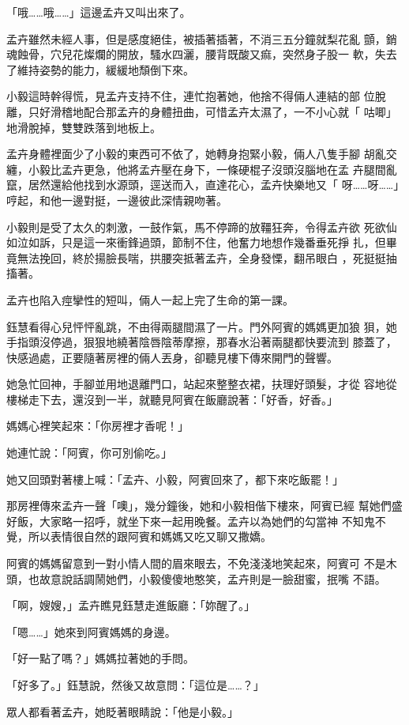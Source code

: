「哦……哦……」這邊孟卉又叫出來了。

孟卉雖然未經人事，但是感度絕佳，被插著插著，不消三五分鐘就梨花亂
顫，銷魂蝕骨，穴兒花燦爛的開放，騷水四灑，腰背既酸又痲，突然身子股一
軟，失去了維持姿勢的能力，緩緩地頹倒下來。

小毅這時幹得慌，見孟卉支持不住，連忙抱著她，他捨不得倆人連結的部
位脫離，只好滑稽地配合那孟卉的身體扭曲，可惜孟卉太濕了，一不小心就「
咕唧」地滑脫掉，雙雙跌落到地板上。

孟卉身體裡面少了小毅的東西可不依了，她轉身抱緊小毅，倆人八隻手腳
胡亂交纏，小毅比孟卉更急，他將孟卉壓在身下，一條硬棍子沒頭沒腦地在孟
卉腿間亂竄，居然還給他找到水源頭，逕送而入，直達花心，孟卉快樂地又「
呀……呀……」哼起，和他一邊對挺，一邊彼此深情親吻著。

小毅則是受了太久的刺激，一鼓作氣，馬不停蹄的放韁狂奔，令得孟卉欲
死欲仙如泣如訴，只是這一來衝鋒過頭，節制不住，他奮力地想作幾番垂死掙
扎，但畢竟無法挽回，終於揚臉長喘，拱腰突抵著孟卉，全身發慄，翻吊眼白
，死挺挺抽搐著。

孟卉也陷入痙攣性的短叫，倆人一起上完了生命的第一課。

鈺慧看得心兒怦怦亂跳，不由得兩腿間濕了一片。門外阿賓的媽媽更加狼
狽，她手指頭沒停過，狠狠地繞著陰唇陰蒂摩擦，那春水沿著兩腿都快要流到
膝蓋了，快感過處，正要隨著房裡的倆人丟身，卻聽見樓下傳來開門的聲響。

她急忙回神，手腳並用地退離門口，站起來整整衣裙，扶理好頭髮，才從
容地從樓梯走下去，還沒到一半，就聽見阿賓在飯廳說著：「好香，好香。」

媽媽心裡笑起來：「你房裡才香呢！」

她連忙說：「阿賓，你可別偷吃。」

她又回頭對著樓上喊：「孟卉、小毅，阿賓回來了，都下來吃飯罷！」

那房裡傳來孟卉一聲「噢」，幾分鐘後，她和小毅相偕下樓來，阿賓已經
幫她們盛好飯，大家略一招呼，就坐下來一起用晚餐。孟卉以為她們的勾當神
不知鬼不覺，所以表情很自然的跟阿賓和媽媽又吃又聊又撒嬌。

阿賓的媽媽留意到一對小情人間的眉來眼去，不免淺淺地笑起來，阿賓可
不是木頭，也故意說話調鬧她們，小毅傻傻地憨笑，孟卉則是一臉甜蜜，抿嘴
不語。

「啊，嫂嫂，」孟卉瞧見鈺慧走進飯廳：「妳醒了。」

「嗯……」她來到阿賓媽媽的身邊。

「好一點了嗎？」媽媽拉著她的手問。

「好多了。」鈺慧說，然後又故意問：「這位是……？」

眾人都看著孟卉，她眨著眼睛說：「他是小毅。」

